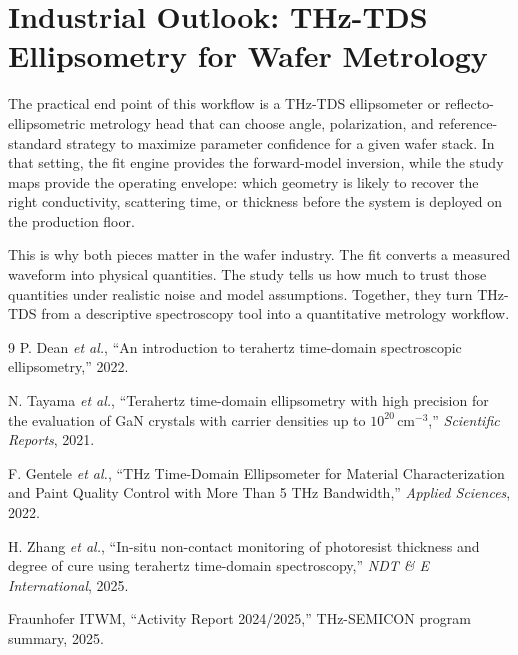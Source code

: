 \documentclass[11pt]{article}
\begin{document}
\section{Industrial Outlook: THz-TDS Ellipsometry for Wafer Metrology}
The practical end point of this workflow is a THz-TDS ellipsometer or reflecto-ellipsometric metrology head that can choose angle, polarization, and reference-standard strategy to maximize parameter confidence for a given wafer stack. In that setting, the fit engine provides the forward-model inversion, while the study maps provide the operating envelope: which geometry is likely to recover the right conductivity, scattering time, or thickness before the system is deployed on the production floor.

This is why both pieces matter in the wafer industry. The fit converts a measured waveform into physical quantities. The study tells us how much to trust those quantities under realistic noise and model assumptions. Together, they turn THz-TDS from a descriptive spectroscopy tool into a quantitative metrology workflow.


\begin{thebibliography}{9}
P. Dean \emph{et al.}, ``An introduction to terahertz time-domain spectroscopic ellipsometry,'' 2022.

N. Tayama \emph{et al.}, ``Terahertz time-domain ellipsometry with high precision for the evaluation of GaN crystals with carrier densities up to $10^{20}\,\mathrm{cm}^{-3}$,'' \emph{Scientific Reports}, 2021.

F. Gentele \emph{et al.}, ``THz Time-Domain Ellipsometer for Material Characterization and Paint Quality Control with More Than 5 THz Bandwidth,'' \emph{Applied Sciences}, 2022.

H. Zhang \emph{et al.}, ``In-situ non-contact monitoring of photoresist thickness and degree of cure using terahertz time-domain spectroscopy,'' \emph{NDT \& E International}, 2025.

Fraunhofer ITWM, ``Activity Report 2024/2025,'' THz-SEMICON program summary, 2025.
\end{thebibliography}
\end{document}
